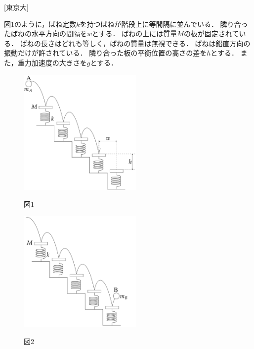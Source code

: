 

\noindent
{} [東京大]


図1のように，ばね定数$k$を持つばねが階段上に等間隔に並んでいる．
隣り合ったばねの水平方向の間隔を$w$とする．
ばねの上には質量$M$の板が固定されている．
ばねの長さはどれも等しく，ばねの質量は無視できる．
ばねは鉛直方向の振動だけが許されている．
隣り合った板の平衡位置の高さの差を$h$とする．
また，重力加速度の大きさを$g$とする．

\begin{figure}[H]
  \centering
  \begin{minipage}{0.45\linewidth}
  \centering
  \includegraphics[width=6cm]{fig/fig_1_12_1.pdf}

  \vspace{-1cm}
  図1
  \end{minipage}
  \begin{minipage}{0.45\linewidth}
  \centering
  \includegraphics[width=6cm]{fig/fig_1_12_2.pdf}
  
  \vspace{-1cm}
  図2
  \end{minipage}
\end{figure}


